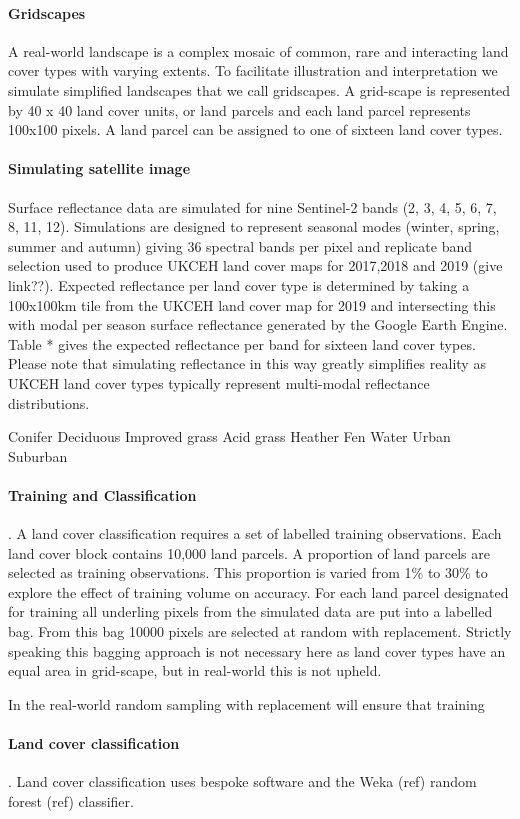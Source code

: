 \paragraph{Gridscapes}
A real-world landscape is a complex mosaic of common, rare and interacting land cover types with varying extents.  To facilitate illustration and interpretation we simulate simplified landscapes that we call gridscapes. A grid-scape is represented by 40 x 40 land cover units, or land parcels and each land parcel represents 100x100 pixels. A land parcel can be assigned to one of sixteen land cover types.  

\paragraph{Simulating satellite image}
Surface reflectance data are simulated for nine Sentinel-2 bands (2, 3, 4, 5, 6, 7, 8, 11, 12).   Simulations are designed to represent seasonal modes (winter, spring, summer and autumn) giving 36 spectral bands per pixel and replicate band selection used to produce UKCEH land cover maps for 2017,2018 and 2019 (give link??).  Expected reflectance per land cover type is determined by taking a 100x100km tile from the UKCEH land cover map for 2019 and intersecting this with modal per season surface reflectance generated by the Google Earth Engine.  Table * gives the expected reflectance per band for sixteen land cover types. Please note that simulating reflectance in this way greatly simplifies reality as UKCEH land cover types typically represent multi-modal reflectance distributions.  




Conifer
Deciduous
Improved grass
Acid grass 
Heather
Fen
Water
Urban
Suburban



\paragraph{Training and Classification}.  A land cover classification requires a set of labelled training observations. Each land cover block contains 10,000 land parcels.  A proportion of land parcels are selected as training observations.  This proportion is varied from 1\% to 30\% to explore the effect of training volume on accuracy.  For each land parcel designated for training all underling pixels from the simulated data are put into a labelled bag.  From this bag 10000 pixels are selected at random with replacement.  Strictly speaking this bagging approach is not necessary here as land cover types have an equal area in grid-scape, but in real-world this is not upheld.  

In the real-world random sampling with replacement will ensure that training 

\paragraph{Land cover classification}.  Land cover classification uses bespoke software and the Weka (ref) random forest (ref) classifier.  
 